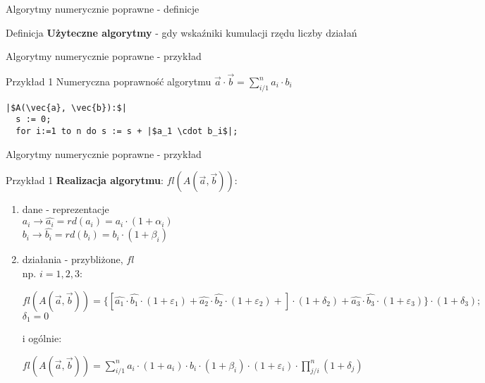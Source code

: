 \begin{frame}{Algorytmy numerycznie poprawne - definicje}
	\begin{block}{Definicja}
		{\bf Użyteczne algorytmy} - gdy wskaźniki kumulacji rzędu liczby działań
	\end{block}
\end{frame}
\begin{frame}[fragile]{Algorytmy numerycznie poprawne - przykład}
	\begin{exampleblock}{Przykład 1}
		Numeryczna poprawność algorytmu $\vec{a} \cdot \vec{b} = \sum_{i/1}^{n} a_i \cdot b_i$
        
\begin{lstlisting}[escapechar=|]
  |$A(\vec{a}, \vec{b}):$|
  s := 0;
  for i:=1 to n do s := s + |$a_1 \cdot b_i$|;
\end{lstlisting}
	\end{exampleblock}
\end{frame}
\begin{frame}{Algorytmy numerycznie poprawne - przykład}
	\begin{exampleblock}{Przykład 1}
		{\bf Realizacja algorytmu}: $fl(A(\vec{a}, \vec{b}))$:
        \begin{enumerate}
        	\item dane - reprezentacje \\
                \hspace{1cm} $a_i \to \hat{a_i} = rd(a_i) = a_i \cdot (1 + \alpha_i)$ \\
                \hspace{1cm} $b_i \to \hat{b_i} = rd(b_i) = b_i \cdot (1 + \beta_i)$
        	\item działania - przybliżone, $fl$ \\
            	np. $i = 1, 2, 3:$ \\ 
                \begin{addmargin}[1em]{0em}
                $
                    fl(A(\vec{a}, \vec{b})) = \{
                        [
                            \hat{a_1} \cdot \hat{b_1} \cdot (1 + \varepsilon_1) +
                            \hat{a_2} \cdot \hat{b_2} \cdot (1 + \varepsilon_2) +
                        ]
                        \cdot (1 + \delta_2) + \hat{a_3} \cdot \hat{b_3} \cdot (1 + \varepsilon_3)
                    \} \cdot (1 + \delta_3); 
                $ \\
                $\delta_1 = 0$ \\
                
                \end{addmargin}
            	i ogólnie:
                \begin{addmargin}[1em]{0em}
                $
                	fl(A(\vec{a}, \vec{b})) =
                	\sum_{i/1}^{n} a_i \cdot (1+a_i) \cdot 
                    b_i \cdot (1 + \beta_i) \cdot (1 + \varepsilon_i)
                    \cdot \prod_{j/i}^{n} (1 + \delta_j)
                $                
                \end{addmargin}
        \end{enumerate}
	\end{exampleblock}
\end{frame}
